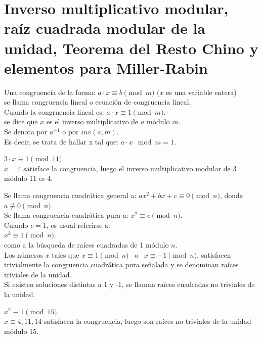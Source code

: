 \section{Inverso multiplicativo modular, raíz cuadrada modular de la unidad, Teorema del Resto Chino y elementos para Miller-Rabin}

\begin{definicion}\label{def:congruencialinealeinv}
Una congruencia de la forma: $a \cdot x \equiv b \pmod m$ \quad ($x$ es una variable entera) \\
se llama congruencia lineal o ecuación de congruencia lineal. \\
Cuando la congruencia lineal es: $a \cdot x \equiv 1 \pmod m$. \\
se dice que $x$ es el inverso multiplicativo de $a$ módulo $m$.\\
Se denota por $a^{-1}$ o por $inv(a,m)$.\\
Es decir, se trata de hallar x tal que: $a \cdot x \mod m=1$.
\end{definicion}

\begin{ejemplo}
$3 \cdot x \equiv 1 \pmod {11}$. \\
$x = 4$ satisface la congruencia, luego el inverso multiplicativo modular de 3 módulo 11 es 4.
\end{ejemplo}

\begin{definicion}\label{def:congrcuadraticaraizde1modn}
Se llama congruencia cuadrática general a:
$ax^2 + bx + c \equiv 0 \pmod n$, donde $a\not\equiv  0 \pmod n$. \\
Se llama congruencia cuadrática pura a:
$x^2 \equiv c \pmod n$. \\
Cuando $c=1$, es usual referirse a: \\
$x^2 \equiv 1 \pmod n$. \\
como a la búsqueda de raíces cuadradas de 1 módulo $n$. \\
Los números $x$ tales que $x \equiv 1 \pmod n$ \, o \, $x \equiv -1 \pmod n$, satisfacen trivialmente la congruencia cuadrática pura señalada y se denominan raíces triviales de la unidad. \\
Si existen soluciones distintas a 1 y -1, se llaman raíces cuadradas no triviales de la unidad.
\end{definicion}

\begin{ejemplo}
$x^2 \equiv 1 \pmod {15}$. \\
$x \equiv 4, 11, 14$ satisfacen la congruencia, luego son raíces no triviales de la unidad módulo 15.
\end{ejemplo}

